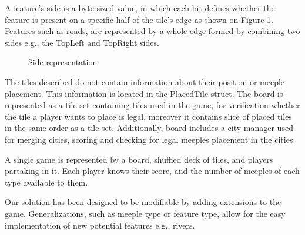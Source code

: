 A feature's side is a byte sized value, in which each bit defines whether the feature is present on a specific half of the tile's edge as shown on Figure \ref{fig:SIDES}. Features such as roads, are represented by a whole edge formed by combining two sides e.g., the TopLeft and TopRight sides.
\begin{figure}
    \centering
    \caption{Side representation} \label{fig:SIDES}
\end{figure}

The tiles described do not contain information about their position or meeple placement. This information is located in the PlacedTile struct. The board is represented as a tile set containing tiles used in the game, for verification whether the tile a player wants to place is legal,  moreover it contains slice of placed tiles in the same order as a tile set. Additionally, board includes a city manager used for merging cities, scoring and checking for legal meeples placement in the cities.

A single game is represented by a board, shuffled deck of tiles, and players partaking in it. Each player knows their score, and the number of meeples of each type available to them.

Our solution has been designed to be modifiable by adding extensions to the game. Generalizations, such as meeple type or feature type, allow for the easy implementation of new potential features e.g., rivers.

